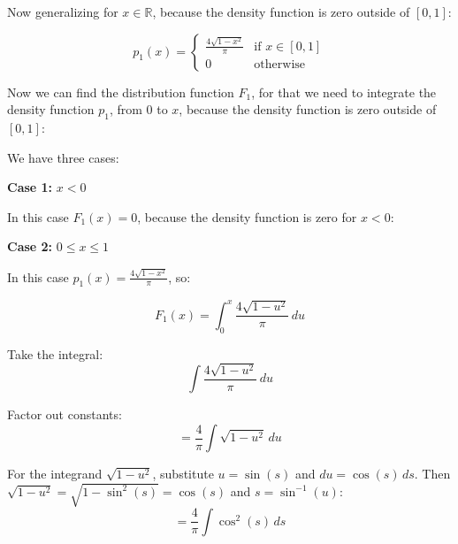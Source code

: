 \singlespacing

Now generalizing for $x \in \mathbb{R}$, because the density function is zero outside of $[0, 1]$:

\singlespacing

\begin{equation}
    p_1(x) = \begin{cases}
        \frac{4\sqrt{1 - x^2}}{\pi} & \text{if } x \in [0, 1] \\
        0                           & \text{otherwise}
    \end{cases}
\end{equation}


\singlespacing

Now we can find the distribution function $F_1$, for that we need to integrate the density function $p_1$,
from $0$ to $x$, because the density function is zero outside of $[0, 1]$:

\singlespacing

We have three cases:

\singlespacing

\textbf{Case 1:} $x < 0$

\singlespacing

In this case $F_1(x) = 0$, because the density function is zero for $x < 0$:

\break
\textbf{Case 2:} $0 \leq x \leq 1$

\singlespacing

In this case $p_1(x) = \frac{4\sqrt{1 - x^2}}{\pi}$, so:

\singlespacing

\begin{equation}
    F_1(x) = \int_{0}^{x} \frac{4\sqrt{1 - u^2}}{\pi} \, du
\end{equation}

\singlespacing
Take the integral:
\singlespacing
\begin{equation}
    \int \frac{4 \sqrt{1 - u^2}}{\pi} \, du
\end{equation}

\singlespacing
Factor out constants:
\singlespacing
\begin{equation}
    = \frac{4}{\pi} \int \sqrt{1 - u^2} \, du
\end{equation}

\singlespacing
For the integrand \(\sqrt{1 - u^2}\), substitute \(u = \sin(s)\) and \(du = \cos(s) \, ds\). Then \(\sqrt{1 - u^2} = \sqrt{1 - \sin^2(s)} = \cos(s)\) and \(s = \sin^{-1}(u)\):
\singlespacing
\begin{equation}
    = \frac{4}{\pi} \int \cos^2(s) \, ds
\end{equation}

